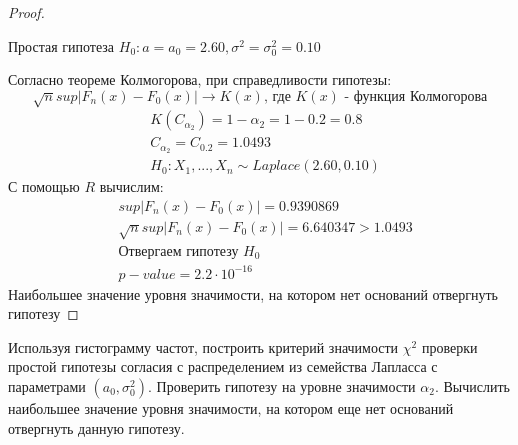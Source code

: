 \begin{proof}
	$ $
	
	Простая гипотеза $H_0: a=a_0=2.60, \sigma^2=\sigma_0^2=0.10$ 
	
	Согласно теореме Колмогорова, при справедливости гипотезы:
	\begin{equation}
		\sqrt{n}sup|F_n(x)-F_0(x)|\rightarrow K(x)\text{, где $K(x)$ - функция Колмогорова}
	\end{equation}
	\begin{align}
		& K(C_{\alpha_2})=1-\alpha_2=1-0.2=0.8 \\
		& C_{\alpha_2}=C_{0.2}=1.0493 \\
		& H_0: X_1, ..., X_n\sim Laplace(2.60, 0.10) 
	\end{align}
	С помощью $R$ вычислим:
	\begin{align}
		& sup|F_n(x)-F_0(x)| = 0.9390869 \\
		& \sqrt{n}sup|F_n(x)-F_0(x)| = 6.640347 > 1.0493 \\
		& \text{Отвергаем гипотезу } H_0 \\
		& p-value = 2.2 \cdot 10^{-16} 
	\end{align}
	Наибольшее значение уровня значимости, на котором нет оснований отвергнуть гипотезу
\end{proof}


\begin{problem}
	Используя гистограмму частот, построить критерий значимости $\chi^2$ проверки простой гипотезы согласия с распределением из семейства Лапласса с параметрами $(a_0, \sigma_0^2)$. Проверить гипотезу на уровне значимости $\alpha_2$. Вычислить наибольшее значение уровня значимости, на котором еще нет оснований отвергнуть данную гипотезу. 
\end{problem}

